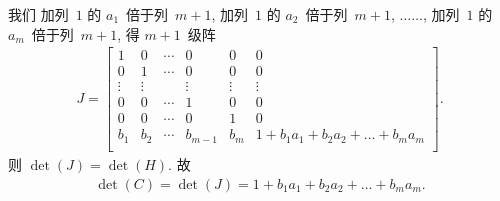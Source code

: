 \begin{example}
    我们%
    加列~\(1\) 的 \(a_1\)~倍于列~\(m+1\),
    加列~\(1\) 的 \(a_2\)~倍于列~\(m+1\),
    \(\dots \dots\),
    加列~\(1\) 的 \(a_m\)~倍于列~\(m+1\),
    得 \(m+1\)~级阵
    \begin{align*}
        J =
        \begin{bmatrix}
            1      & 0      & \cdots & 0       & 0      & 0                                       \\
            0      & 1      & \cdots & 0       & 0      & 0                                       \\
            \vdots & \vdots & {}     & \vdots  & \vdots & \vdots                                  \\
            0      & 0      & \cdots & 1       & 0      & 0                                       \\
            0      & 0      & \cdots & 0       & 1      & 0                                       \\
            b_1    & b_2    & \cdots & b_{m-1} & b_m    & 1 + b_1 a_1 + b_2 a_2 + \dots + b_m a_m \\
        \end{bmatrix}.
    \end{align*}
    则 \(\det {(J)} = \det {(H)}\).
    故
    \begin{align*}
        \det {(C)} = \det {(J)}
        = 1 + b_1 a_1 + b_2 a_2 + \dots + b_m a_m.
    \end{align*}
\end{example}

